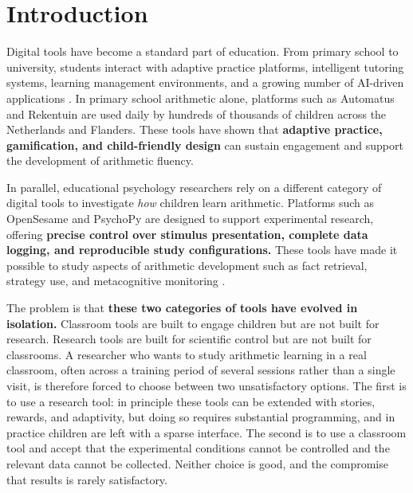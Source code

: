 \chapter{Introduction}

Digital tools have become a standard part of education. From primary school to university, students interact with adaptive practice platforms, intelligent tutoring systems, learning management environments, and a growing number of AI-driven applications \cite{dancsa_digital_2023}. In primary school arithmetic alone, platforms such as Automatus \cite{automatus} and Rekentuin \cite{rekentuin} are used daily by hundreds of thousands of children across the Netherlands and Flanders. These tools have shown that \textbf{adaptive practice, gamification, and child-friendly design} can sustain engagement and support the development of arithmetic fluency.

In parallel, educational psychology researchers rely on a different category of digital tools to investigate \emph{how} children learn arithmetic. Platforms such as OpenSesame \cite{mathot_opensesame_2012} and PsychoPy \cite{peirce2019psychopy2} are designed to support experimental research, offering \textbf{precise control over stimulus presentation, complete data logging, and reproducible study configurations.} These tools have made it possible to study aspects of arithmetic development such as fact retrieval, strategy use, and metacognitive monitoring \cite{bellon_more_2019, rinne_knowing_2014}.

The problem is that \textbf{these two categories of tools have evolved in isolation.} Classroom tools are built to engage children but are not built for research. Research tools are built for scientific control but are not built for classrooms. A researcher who wants to study arithmetic learning in a real classroom, often across a training period of several sessions rather than a single visit, is therefore forced to choose between two unsatisfactory options. The first is to use a research tool: in principle these tools can be extended with stories, rewards, and adaptivity, but doing so requires substantial programming, and in practice children are left with a sparse interface. The second is to use a classroom tool and accept that the experimental conditions cannot be controlled and the relevant data cannot be collected. Neither choice is good, and the compromise that results is rarely satisfactory.

